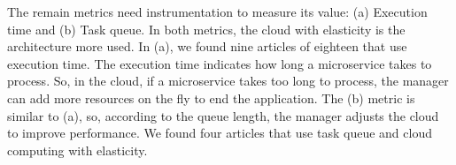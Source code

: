 The remain metrics need instrumentation to measure its value: (a) Execution time and (b) Task queue. In both metrics, the cloud with elasticity is the architecture more used. In (a), we found nine articles of eighteen that use execution time. The execution time indicates how long a microservice takes to process. So, in the cloud, if a microservice takes too long to process, the manager can add more resources on the fly to end the application. The (b) metric is similar to (a), so, according to the queue length, the manager adjusts the cloud to improve performance. We found four articles that use task queue and cloud computing with elasticity.
